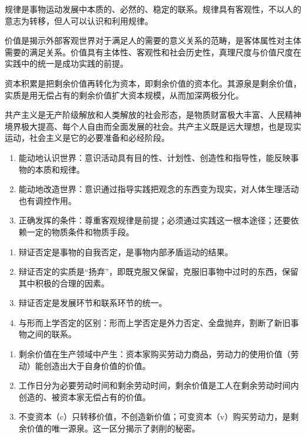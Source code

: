 

\da 规律是事物运动发展中本质的、必然的、稳定的联系。规律具有客观性，不以人的意志为转移，但人可以认识和利用规律。

\da 价值是揭示外部客观世界对于满足人的需要的意义关系的范畴，是客体属性对主体需要的满足关系。价值具有主体性、客观性和社会历史性，真理尺度与价值尺度在实践中的统一是成功实践的前提。

\da 资本积累是把剩余价值再转化为资本，即剩余价值的资本化。其源泉是剩余价值，实质是用无偿占有的剩余价值扩大资本规模，从而加深两极分化。

\da 共产主义是无产阶级解放和人类解放的社会形态，是物质财富极大丰富、人民精神境界极大提高、每个人自由而全面发展的社会。共产主义既是远大理想，也是现实运动，社会主义是它的必要准备和必经阶段。


\yaodian
\begin{enumerate}[label=(\arabic*),leftmargin=2.2em,itemsep=2pt,topsep=2pt]
\item 能动地认识世界：意识活动具有目的性、计划性、创造性和指导性，能反映事物的本质和规律。
\item 能动地改造世界：意识通过指导实践把观念的东西变为现实，对人体生理活动也有调控作用。
\item 正确发挥的条件：尊重客观规律是前提；必须通过实践这一根本途径；还要依赖一定的物质条件和物质手段。
\end{enumerate}

\yaodian
\begin{enumerate}[label=(\arabic*),leftmargin=2.2em,itemsep=2pt,topsep=2pt]
\item 辩证否定是事物的自我否定，是事物内部矛盾运动的结果。
\item 辩证否定的实质是“扬弃”，即既克服又保留，克服旧事物中过时的东西，保留其中积极的合理的因素。
\item 辩证否定是发展环节和联系环节的统一。
\item 与形而上学否定的区别：形而上学否定是外力否定、全盘抛弃，割断了新旧事物之间的联系。
\end{enumerate}

\yaodian
\begin{enumerate}[label=(\arabic*),leftmargin=2.2em,itemsep=2pt,topsep=2pt]
\item 剩余价值在生产领域中产生：资本家购买劳动力商品，劳动力的使用价值（劳动）能创造出大于自身价值的价值。
\item 工作日分为必要劳动时间和剩余劳动时间，剩余价值是工人在剩余劳动时间内创造的、被资本家无偿占有的价值。
\item 不变资本（c）只转移价值，不创造新价值；可变资本（v）购买劳动力，是剩余价值的唯一源泉。这一区分揭示了剥削的秘密。
\end{enumerate}

